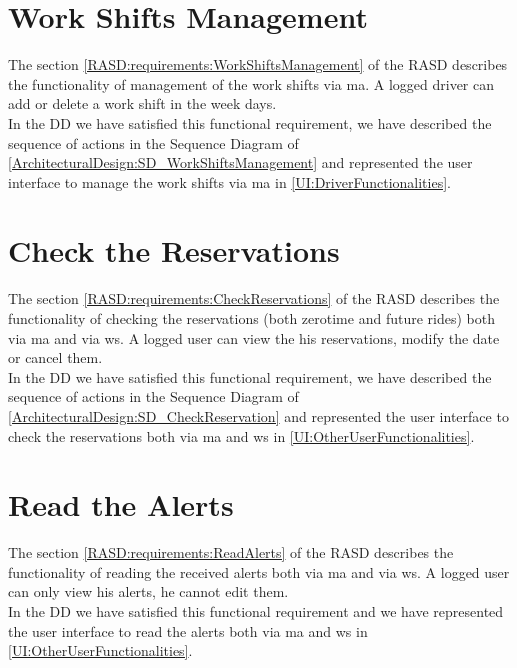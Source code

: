 \documentclass[\mainpath/main]{subfiles}
\begin{document}
\section{Work Shifts Management}
The section \ref{RASD:requirements:WorkShiftsManagement} of the RASD describes the functionality of management of the work shifts via \gls{ma}. A logged driver can add or delete a work shift in the week days.\\
In the DD we have satisfied this functional requirement, we have described the sequence of actions in the Sequence Diagram of \autoref{ArchitecturalDesign:SD_WorkShiftsManagement} and represented the user interface to manage the work shifts via \gls{ma} in \autoref{UI:DriverFunctionalities}.

\section{Check the Reservations}
The section \ref{RASD:requirements:CheckReservations} of the RASD describes the functionality of checking the reservations (both zerotime and future rides) both via \gls{ma} and via \gls{ws}. A logged user can view the his reservations, modify the date or cancel them.\\
In the DD we have satisfied this functional requirement, we have described the sequence of actions in the Sequence Diagram of \autoref{ArchitecturalDesign:SD_CheckReservation} and represented the user interface to check the reservations both via \gls{ma} and \gls{ws} in \autoref{UI:OtherUserFunctionalities}.

\section{Read the Alerts}
The section \ref{RASD:requirements:ReadAlerts} of the RASD describes the functionality of reading the received alerts both via \gls{ma} and via \gls{ws}. A logged user can only view his alerts, he cannot edit them.\\
In the DD we have satisfied this functional requirement and we have represented the user interface to read the alerts both via \gls{ma} and \gls{ws} in \autoref{UI:OtherUserFunctionalities}.
\end{document}
